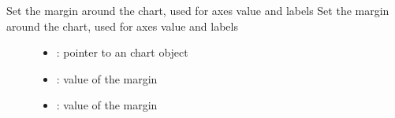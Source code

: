 \documentclass[letterpaper,10pt,english]{sphinxmanual}
\begin{document}

\begin{fulllineitems}
\label{\detokenize{object-types/chart:_CPPv419lv_chart_set_marginP8lv_obj_t8uint16_t}}%
\pysigstartmultiline
{}\label{\detokenize{object-types/chart:lv__chart_8h_1a57f96b06edadd1792ca1594b88d33cfe}}%
\pysigstopmultiline
Set the margin around the chart, used for axes value and labels 
Set the margin around the chart, used for axes value and labels 
\begin{description}
\item[{}] \leavevmode\begin{itemize}
\item {} 
: pointer to an chart object 

\item {} 
: value of the margin

\end{itemize}

\item[{}] \leavevmode\begin{itemize}
\item {} 
: value of the margin 

\end{itemize}

\end{description}


\end{fulllineitems}

\end{document}
